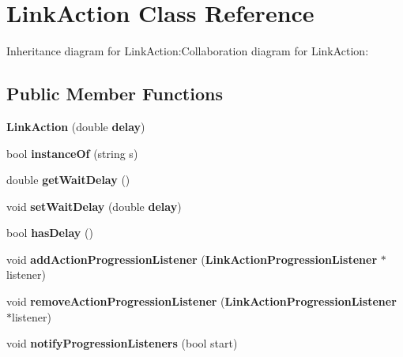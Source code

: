 \section{LinkAction Class Reference}
\label{classbr_1_1pucrio_1_1telemidia_1_1ginga_1_1ncl_1_1model_1_1link_1_1LinkAction}
Inheritance diagram for LinkAction:Collaboration diagram for LinkAction:\subsection*{Public Member Functions}
\begin{CompactItemize}
\item 
\textbf{LinkAction} (double {\bf delay})\label{classbr_1_1pucrio_1_1telemidia_1_1ginga_1_1ncl_1_1model_1_1link_1_1LinkAction_7b6879a978b136161fe770e1958823de}

\item 
bool \textbf{instanceOf} (string s)\label{classbr_1_1pucrio_1_1telemidia_1_1ginga_1_1ncl_1_1model_1_1link_1_1LinkAction_4081cb1ebb5adebc1d0858ff6f69af0d}

\item 
double \textbf{getWaitDelay} ()\label{classbr_1_1pucrio_1_1telemidia_1_1ginga_1_1ncl_1_1model_1_1link_1_1LinkAction_8d2a209d7f72371c9d6d1f88cfe8da36}

\item 
void \textbf{setWaitDelay} (double {\bf delay})\label{classbr_1_1pucrio_1_1telemidia_1_1ginga_1_1ncl_1_1model_1_1link_1_1LinkAction_ea0ff3516d9409b34fa29ce7b08bb8a2}

\item 
bool \textbf{hasDelay} ()\label{classbr_1_1pucrio_1_1telemidia_1_1ginga_1_1ncl_1_1model_1_1link_1_1LinkAction_aa700587d83e2db129e8229e2572bb09}

\item 
void \textbf{addActionProgressionListener} ({\bf LinkActionProgressionListener} $\ast$listener)\label{classbr_1_1pucrio_1_1telemidia_1_1ginga_1_1ncl_1_1model_1_1link_1_1LinkAction_c35560b4dac5e980173375b7b83ac534}

\item 
void \textbf{removeActionProgressionListener} ({\bf LinkActionProgressionListener} $\ast$listener)\label{classbr_1_1pucrio_1_1telemidia_1_1ginga_1_1ncl_1_1model_1_1link_1_1LinkAction_22d8a46458ce5e9e9ffd26e5ab84c6c6}

\item 
void \textbf{notifyProgressionListeners} (bool start)\label{classbr_1_1pucrio_1_1telemidia_1_1ginga_1_1ncl_1_1model_1_1link_1_1LinkAction_019e523665e8727c1fdcf4d6498d82b9}


\end{CompactItemize}
